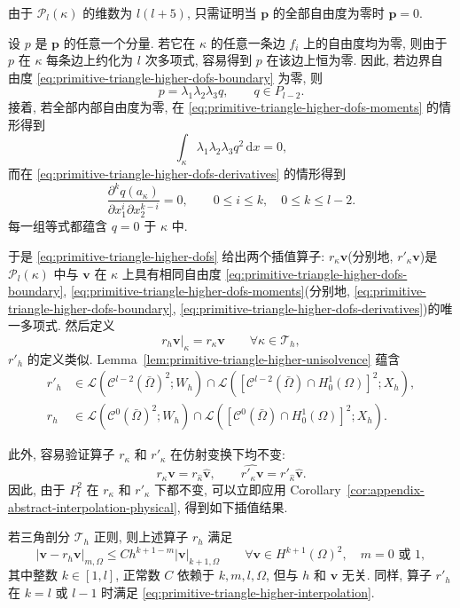 \begin{Proof}
由于 $\mathcal{P}_l(\kappa)$ 的维数为 $l(l+5)$,
只需证明当 $\mathbf p$ 的全部自由度为零时 $\mathbf p=0$.

设 $p$ 是 $\mathbf p$ 的任意一个分量. 若它在 $\kappa$ 的任意一条边
$f_i$ 上的自由度均为零, 则由于 $p$ 在 $\kappa$ 每条边上约化为
$l$ 次多项式, 容易得到 $p$ 在该边上恒为零. 因此, 若边界自由度
\eqref{eq:primitive-triangle-higher-dofs-boundary} 为零, 则
\[
p=\lambda_1\lambda_2\lambda_3q,
\qquad q\in P_{l-2}.
\]
接着, 若全部内部自由度为零, 在
\eqref{eq:primitive-triangle-higher-dofs-moments} 的情形得到
\[
\int_\kappa\lambda_1\lambda_2\lambda_3q^2\,\mathrm dx=0,
\]
而在 \eqref{eq:primitive-triangle-higher-dofs-derivatives} 的情形得到
\[
\frac{\partial^kq(a_\kappa)}
{\partial x_1^i\partial x_2^{k-i}}=0,
\qquad0\leq i\leq k,\quad0\leq k\leq l-2.
\]
每一组等式都蕴含 $q=0$ 于 $\kappa$ 中.
\end{Proof}

于是 \eqref{eq:primitive-triangle-higher-dofs} 给出两个插值算子:
$r_\kappa\mathbf v$(分别地, $r'_\kappa\mathbf v$)是
$\mathcal{P}_l(\kappa)$ 中与 $\mathbf v$ 在 $\kappa$ 上具有相同自由度
\eqref{eq:primitive-triangle-higher-dofs-boundary},
\eqref{eq:primitive-triangle-higher-dofs-moments}(分别地,
\eqref{eq:primitive-triangle-higher-dofs-boundary},
\eqref{eq:primitive-triangle-higher-dofs-derivatives})的唯一多项式.
然后定义
\[
r_h\mathbf v|_\kappa=r_\kappa\mathbf v
\qquad\forall\kappa\in\mathcal{T}_h,
\]
$r'_h$ 的定义类似. Lemma~\ref{lem:primitive-triangle-higher-unisolvence}
蕴含
\[
\begin{aligned}
r'_h&\in
\mathcal L(\mathcal C^{l-2}(\bar\Omega)^2;W_h)
\cap\mathcal L([\mathcal C^{l-2}(\bar\Omega)\cap H_0^1(\Omega)]^2;X_h),\\
r_h&\in
\mathcal L(\mathcal C^0(\bar\Omega)^2;W_h)
\cap\mathcal L([\mathcal C^0(\bar\Omega)\cap H_0^1(\Omega)]^2;X_h).
\end{aligned}
\]

此外, 容易验证算子 $r_\kappa$ 和 $r'_\kappa$ 在仿射变换下均不变:
\[
\widehat{r_\kappa\mathbf v}=r_{\hat\kappa}\hat{\mathbf v},
\qquad
\widehat{r'_\kappa\mathbf v}=r'_{\hat\kappa}\hat{\mathbf v}.
\]
因此, 由于 $P_l^2$ 在 $r_\kappa$ 和 $r'_\kappa$ 下都不变,
可以立即应用 Corollary~\ref{cor:appendix-abstract-interpolation-physical},
得到如下插值结果.

\setcounter{statement}{3}
\begin{Lemma}\label{lem:primitive-triangle-higher-interpolation}
若三角剖分 $\mathcal{T}_h$ 正则, 则上述算子 $r_h$ 满足
\begin{equation}\label{eq:primitive-triangle-higher-interpolation}
|\mathbf v-r_h\mathbf v|_{m,\Omega}
\leq Ch^{k+1-m}|\mathbf v|_{k+1,\Omega}
\qquad\forall\mathbf v\in H^{k+1}(\Omega)^2,
\quad m=0\text{ 或 }1,
\end{equation}
其中整数 $k\in[1,l]$, 正常数 $C$ 依赖于 $k,m,l,\Omega$,
但与 $h$ 和 $\mathbf v$ 无关. 同样, 算子 $r'_h$ 在 $k=l$
或 $l-1$ 时满足 \eqref{eq:primitive-triangle-higher-interpolation}.
\end{Lemma}

